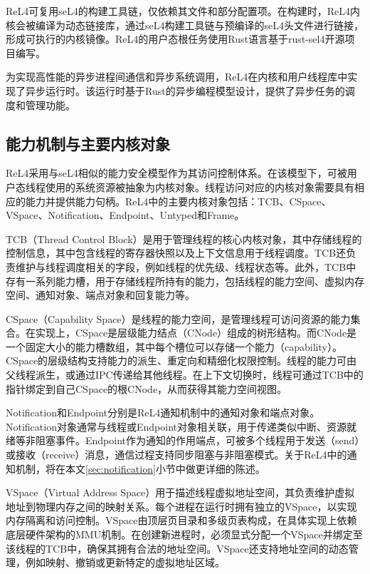 ReL4可复用seL4的构建工具链，仅依赖其文件和部分配置项。在构建时，ReL4内核会被编译为动态链接库，通过seL4构建工具链与预编译的seL4头文件进行链接，形成可执行的内核镜像。ReL4的用户态根任务使用Rust语言基于rust-sel4开源项目编写。

为实现高性能的异步进程间通信和异步系统调用，ReL4在内核和用户线程库中实现了异步运行时。该运行时基于Rust的异步编程模型设计，提供了异步任务的调度和管理功能。

\subsection{能力机制与主要内核对象}

ReL4采用与seL4相似的能力安全模型作为其访问控制体系。在该模型下，可被用户态线程使用的系统资源被抽象为内核对象。线程访问对应的内核对象需要具有相应的能力并提供能力句柄\cite{2008Verified}。ReL4中的主要内核对象包括：TCB、CSpace、VSpace、Notification、Endpoint、Untyped和Frame。


TCB（Thread Control Block）是用于管理线程的核心内核对象，其中存储线程的控制信息，其中包含线程的寄存器快照以及上下文信息用于线程调度。TCB还负责维护与线程调度相关的字段，例如线程的优先级、线程状态等。此外，TCB中存有一系列能力槽，用于存储线程所持有的能力，包括线程的能力空间、虚拟内存空间、通知对象、端点对象和回复能力等。


CSpace（Capability Space）是线程的能力空间，是管理线程可访问资源的能力集合。在实现上，CSpace是层级能力结点（CNode）组成的树形结构。而CNode是一个固定大小的能力槽数组，其中每个槽位可以存储一个能力（capability）。CSpace的层级结构支持能力的派生、重定向和精细化权限控制。线程的能力可由父线程派生，或通过IPC传递给其他线程。在上下文切换时，线程可通过TCB中的指针绑定到自己CSpace的根CNode，从而获得其能力空间视图。


Notification和Endpoint分别是ReL4通知机制中的通知对象和端点对象。Notification对象通常与线程或Endpoint对象相关联，用于传递类似中断、资源就绪等非阻塞事件。Endpoint作为通知的作用端点，可被多个线程用于发送（send）或接收（receive）消息，通信过程支持同步阻塞与非阻塞模式。关于ReL4中的通知机制，将在本文\ref{sec:notification}小节中做更详细的陈述。


VSpace（Virtual Address Space）用于描述线程虚拟地址空间，其负责维护虚拟地址到物理内存之间的映射关系。每个进程在运行时拥有独立的VSpace，以实现内存隔离和访问控制。VSpace由顶层页目录和多级页表构成，在具体实现上依赖底层硬件架构的MMU机制。在创建新进程时，必须显式分配一个VSpace并绑定至该线程的TCB中，确保其拥有合法的地址空间。VSpace还支持地址空间的动态管理，例如映射、撤销或更新特定的虚拟地址区域。


